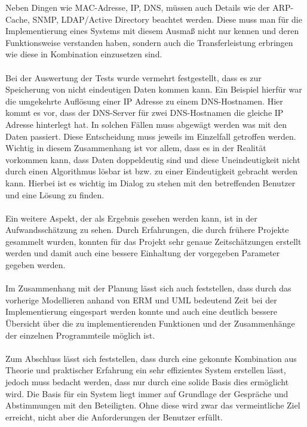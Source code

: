 Neben Dingen wie MAC-Adresse, IP, DNS, müssen auch Details wie der ARP-Cache, SNMP, LDAP/Active Directory beachtet werden.
Diese muss man für die Implementierung eines Systems mit diesem Ausmaß nicht nur kennen und deren Funktionsweise verstanden haben, sondern auch die Transferleistung erbringen wie diese in Kombination einzusetzen sind.\\\\
Bei der Auswertung der Tests wurde vermehrt festgestellt, dass es zur Speicherung von nicht eindeutigen Daten kommen kann.
Ein Beispiel hierfür war die umgekehrte Auflösung einer IP Adresse zu einem DNS-Hostnamen.
Hier kommt es vor, dass der DNS-Server für zwei DNS-Hostnamen die gleiche IP Adresse hinterlegt hat.
In solchen Fällen muss abgewägt werden was mit den Daten passiert. Diese Entscheidung muss jeweils im Einzelfall getroffen werden.
Wichtig in diesem Zusammenhang ist vor allem, dass es in der Realität vorkommen kann, dass Daten doppeldeutig sind und diese Uneindeutigkeit nicht durch einen Algorithmus lösbar ist bzw. zu einer Eindeutigkeit gebracht werden kann.
Hierbei ist es wichtig im Dialog zu stehen mit den betreffenden Benutzer und eine Lösung zu finden.\\\\
Ein weitere Aspekt, der als Ergebnis gesehen werden kann, ist in der Aufwandsschätzung zu sehen.
Durch Erfahrungen, die durch frühere Projekte gesammelt wurden, konnten für das Projekt sehr genaue Zeitschätzungen erstellt werden und damit auch eine bessere Einhaltung der vorgegeben Parameter gegeben werden.\\\\
Im Zusammenhang mit der Planung lässt sich auch feststellen, dass durch das vorherige Modellieren anhand von ERM und UML bedeutend Zeit bei der Implementierung eingespart werden konnte und auch eine deutlich bessere Übersicht über die zu implementierenden Funktionen und der Zusammenhänge der einzelnen Programmteile möglich ist.\\\\
Zum Abschluss lässt sich feststellen, dass durch eine gekonnte Kombination aus Theorie und praktischer Erfahrung ein sehr effizientes System erstellen lässt, jedoch muss bedacht werden, dass nur durch eine solide Basis dies ermöglicht wird.
Die Basis für ein System liegt immer auf Grundlage der Gespräche und Abstimmungen mit den Beteiligten. Ohne diese wird zwar das vermeintliche Ziel erreicht, nicht aber die Anforderungen der Benutzer erfüllt.